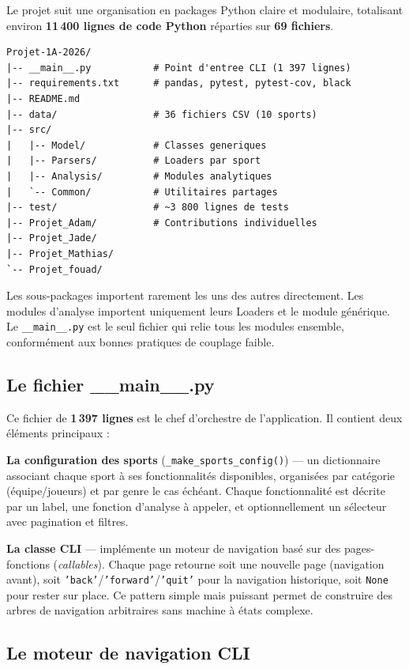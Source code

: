 \documentclass[12pt,a4paper]{article}
\newcommand{\code}[1]{\texttt{#1}}
\newcommand{\fichier}[1]{\texttt{#1}}
\begin{document}
Le projet suit une organisation en packages Python claire et modulaire, totalisant
environ \textbf{11\,400 lignes de code Python} réparties sur \textbf{69 fichiers}.

\begin{Verbatim}[fontsize=\small, frame=single]
Projet-1A-2026/
|-- __main__.py           # Point d'entree CLI (1 397 lignes)
|-- requirements.txt      # pandas, pytest, pytest-cov, black
|-- README.md
|-- data/                 # 36 fichiers CSV (10 sports)
|-- src/
|   |-- Model/            # Classes generiques
|   |-- Parsers/          # Loaders par sport
|   |-- Analysis/         # Modules analytiques
|   `-- Common/           # Utilitaires partages
|-- test/                 # ~3 800 lignes de tests
|-- Projet_Adam/          # Contributions individuelles
|-- Projet_Jade/
|-- Projet_Mathias/
`-- Projet_fouad/
\end{Verbatim}

Les sous-packages importent rarement les uns des autres directement. Les modules
d'analyse importent uniquement leurs Loaders et le module générique. Le
\fichier{\_\_main\_\_.py} est le seul fichier qui relie tous les modules ensemble,
conformément aux bonnes pratiques de couplage faible.

\subsection{Le fichier \_\_main\_\_.py}

Ce fichier de \textbf{1\,397 lignes} est le chef d'orchestre de l'application.
Il contient deux éléments principaux :

\textbf{La configuration des sports} (\code{\_make\_sports\_config()}) --- un
dictionnaire associant chaque sport à ses fonctionnalités disponibles, organisées par
catégorie (équipe/joueurs) et par genre le cas échéant. Chaque fonctionnalité est décrite
par un label, une fonction d'analyse à appeler, et optionnellement un sélecteur avec
pagination et filtres.

\textbf{La classe CLI} --- implémente un moteur de navigation basé sur des
pages-fonctions (\textit{callables}). Chaque page retourne soit une nouvelle page
(navigation avant), soit \code{'back'}/\code{'forward'}/\code{'quit'} pour la navigation
historique, soit \code{None} pour rester sur place. Ce pattern simple mais puissant
permet de construire des arbres de navigation arbitraires sans machine à états complexe.

\subsection{Le moteur de navigation CLI}
\end{document}
